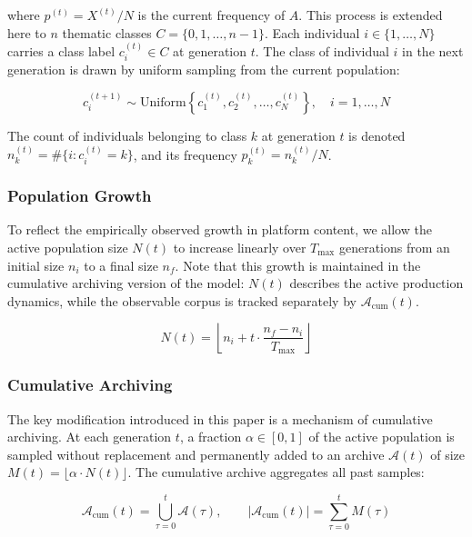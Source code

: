 \documentclass{anthology-ch}         %
\begin{document}
where $p^{(t)} = X^{(t)}/N$ is the current frequency of $A$. This process is extended here to $n$ thematic classes $C = \{0, 1, \ldots, n-1\}$. Each individual $i \in \{1,\ldots,N\}$ carries a class label $c_i^{(t)} \in C$ at generation $t$. The class of individual $i$ in the next generation is drawn by uniform sampling from the current population:

\begin{equation}
c_i^{(t+1)} \sim \text{Uniform}\!\left\{c_1^{(t)}, c_2^{(t)}, \ldots, c_N^{(t)}\right\}, \quad i = 1, \ldots, N
\end{equation}

The count of individuals belonging to class $k$ at generation $t$ is denoted $n_k^{(t)} = \#\{i : c_i^{(t)} = k\}$, and its frequency $p_k^{(t)} = n_k^{(t)}/N$.

\subsubsection{Population Growth}

To reflect the empirically observed growth in platform content, we allow the active population size $N(t)$ to increase linearly over $T_{\max}$ generations from an initial size $n_i$ to a final size $n_f$. Note that this growth is maintained in the cumulative archiving version of the model: $N(t)$ describes the active production dynamics, while the observable corpus is tracked separately by $\mathcal{A}_{\mathrm{cum}}(t)$.

\begin{equation}
N(t) = \left\lfloor n_i + t \cdot \frac{n_f - n_i}{T_{\max}} \right\rfloor
\end{equation}

\subsubsection{Cumulative Archiving}

The key modification introduced in this paper is a mechanism of cumulative archiving. At each generation $t$, a fraction $\alpha \in [0,1]$ of the active population is sampled without replacement and permanently added to an archive $\mathcal{A}(t)$ of size $M(t) = \lfloor \alpha \cdot N(t) \rfloor$. The cumulative archive aggregates all past samples:

\begin{equation}
\mathcal{A}_{\mathrm{cum}}(t) = \bigcup_{\tau=0}^{t} \mathcal{A}(\tau), \qquad \left|\mathcal{A}_{\mathrm{cum}}(t)\right| = \sum_{\tau=0}^{t} M(\tau)
\end{equation}
\end{document}
